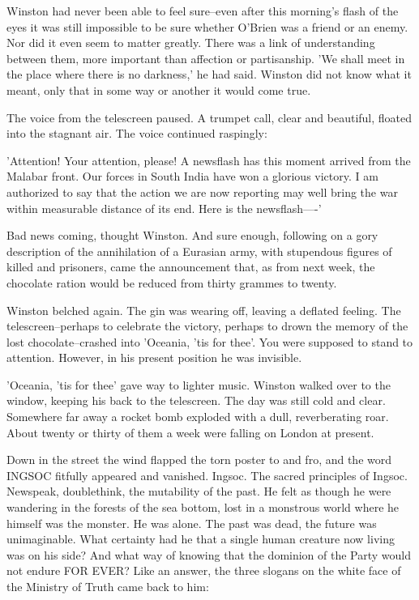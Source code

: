 \documentclass{article}
\begin{document}
Winston had never been able to feel sure--even after this morning's flash
of the eyes it was still impossible to be sure whether O'Brien was a friend
or an enemy. Nor did it even seem to matter greatly. There was a link of
understanding between them, more important than affection or partisanship.
'We shall meet in the place where there is no darkness,' he had said.
Winston did not know what it meant, only that in some way or another it
would come true.

The voice from the telescreen paused. A trumpet call, clear and beautiful,
floated into the stagnant air. The voice continued raspingly:

'Attention! Your attention, please! A newsflash has this moment arrived
from the Malabar front. Our forces in South India have won a glorious
victory. I am authorized to say that the action we are now reporting may
well bring the war within measurable distance of its end. Here is the
newsflash----'

Bad news coming, thought Winston. And sure enough, following on a gory
description of the annihilation of a Eurasian army, with stupendous figures
of killed and prisoners, came the announcement that, as from next week,
the chocolate ration would be reduced from thirty grammes to twenty.

Winston belched again. The gin was wearing off, leaving a deflated feeling.
The telescreen--perhaps to celebrate the victory, perhaps to drown the
memory of the lost chocolate--crashed into 'Oceania, 'tis for thee'. You
were supposed to stand to attention. However, in his present position he
was invisible.

'Oceania, 'tis for thee' gave way to lighter music. Winston walked over to
the window, keeping his back to the telescreen. The day was still cold and
clear. Somewhere far away a rocket bomb exploded with a dull, reverberating
roar. About twenty or thirty of them a week were falling on London at
present.

Down in the street the wind flapped the torn poster to and fro, and the
word INGSOC fitfully appeared and vanished. Ingsoc. The sacred principles
of Ingsoc. Newspeak, doublethink, the mutability of the past. He felt as
though he were wandering in the forests of the sea bottom, lost in a
monstrous world where he himself was the monster. He was alone. The past
was dead, the future was unimaginable. What certainty had he that a single
human creature now living was on his side? And what way of knowing that the
dominion of the Party would not endure FOR EVER? Like an answer, the three
slogans on the white face of the Ministry of Truth came back to him:
\end{document}
